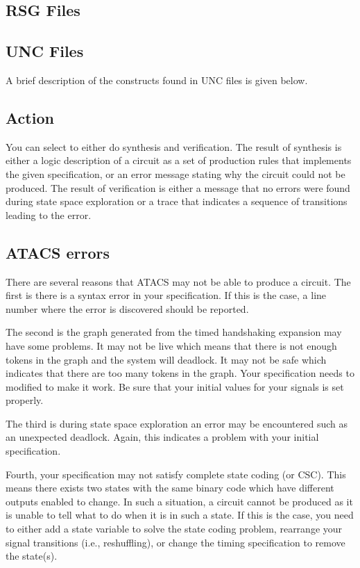 \documentclass[titlepage,11pt]{article}
\begin{document}
  \subsection{RSG Files}
  
  \subsection{UNC Files}
  A brief description of the constructs found in UNC files is given below.
  
  \subsection{Action}
  You can select to either do synthesis and verification.  The result of
  synthesis is either a logic description of a circuit as a set of
  production rules that implements the given specification, or an error
  message stating why the circuit could not be produced.  The result of
  verification is either a message that no errors were found during
  state space exploration or a trace that indicates a sequence of
  transitions leading to the error.
  
  \subsection{ATACS errors}
  There are several reasons that ATACS may not be able to produce a
  circuit.  The first is there is a syntax error in your specification.
  If this is the case, a line number where the error is discovered
  should be reported.
  
  The second is the graph generated from the timed handshaking expansion
  may have some problems.  It may not be live which means that there is
  not enough tokens in the graph and the system will deadlock.  It may
  not be safe which indicates that there are too many tokens in the
  graph.  Your specification needs to modified to make it work.  Be sure
  that your initial values for your signals is set properly.
  
  The third is during state space exploration an error may be
  encountered such as an unexpected deadlock.  Again, this indicates a
  problem with your initial specification.
  
  Fourth, your specification may not satisfy complete state coding (or
  CSC).  This means there exists two states with the same binary code
  which have different outputs enabled to change.  In such a
  situation, a circuit cannot be produced as it is unable to tell what
  to do when it is in such a state.  If this is the case, you need to
  either add a state variable to solve the state coding problem,
  rearrange your signal transitions (i.e., reshuffling), or change the
  timing specification to remove the state(s).
  
\end{document}
